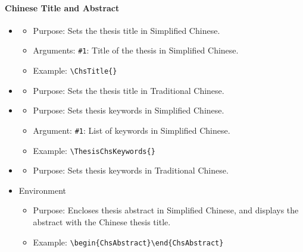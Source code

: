 \paragraph{Chinese Title and Abstract}
\begin{itemize}[noitemsep]
\item {}
\begin{itemize}[noitemsep]
  \item \textsf{Purpose:} Sets the thesis title in Simplified Chinese.
  \item \textsf{Arguments:} \texttt{\#1}: Title of the thesis in Simplified Chinese.
  \item \textsf{Example:} \verb|\ChsTitle{|\verb|}|
\end{itemize}

\item {}
\begin{itemize}[noitemsep]
  \item \textsf{Purpose:} Sets the thesis title in Traditional Chinese.
\end{itemize}

\item {}
\begin{itemize}[noitemsep]
  \item \textsf{Purpose:} Sets thesis keywords in Simplified Chinese.
  \item \textsf{Argument:} \texttt{\#1}: List of keywords in Simplified Chinese.
  \item \textsf{Example:} \verb|\ThesisChsKeywords{|\verb|}|
\end{itemize}

\item {}
\begin{itemize}[noitemsep]
  \item \textsf{Purpose:} Sets thesis keywords in Traditional Chinese.
\end{itemize}

\item Environment 
\begin{itemize}[noitemsep]
  \item \textsf{Purpose:} Encloses thesis abstract in Simplified Chinese, and displays the abstract with the Chinese thesis title.
  \item \textsf{Example:} \verb|\begin{ChsAbstract}|\verb|\end{ChsAbstract}|
\end{itemize}


\end{itemize}
